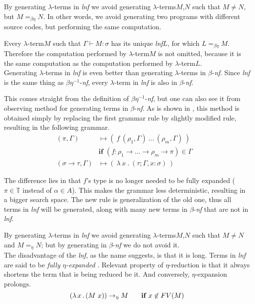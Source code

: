 \documentclass{sig-alternate}
\newcommand{\lterm}{$\lambda$-term\xspace}
\newcommand{\lterms}{$\lambda$-terms\xspace}
\newcommand{\turst}[3]{$#1\vdash{}#2:#3$\xspace}
\newcommand{\GMS}{\turst{\Gamma}{M}{\sigma}}
\newcommand{\lamb}[2]{( \lambda \, #1 \, . \, #2 )}
\newcommand{\bnf}{$\beta$-\textit{nf}\xspace}
\newcommand{\beenf}{$\beta\eta^{-1}$-\textit{nf}\xspace}
\newcommand{\lnf}{\textit{lnf}\xspace}
\newcommand{\ar}{\rightarrow\xspace}
\newcommand{\T}{\mathbb{T}\xspace}
\newcommand{\gar}{\longmapsto}
\begin{document}
By generating \lterms in \textit{lnf} we avoid generating 
\lterms $M$,$N$ such that $M \not= N$, but $M =_{\beta\eta} N$.
In other words, we avoid generating two programs with different 
source codes, but performing the same computation.

Every \lterm $M$ such that \GMS has its unique \lnf $L$, 
for which $L =_{\beta\eta} M$.
Therefore the computation performed by \lterm $M$ 
is not omitted, because it is the same computation
as the computation performed by \lterm $L$. \\

Generating \lterms in \lnf is even better than generating 
\lterms in \bnf. Since \lnf is the same thing as \beenf,
every \lterm in \lnf is also in \bnf. 

This comes straight from the definition of \beenf, 
but one can also see it from observing method for generating
terms in \bnf. As is shown in \cite{barendregt10}, 
this method is obtained simply by replacing  
the first grammar rule by slightly modified rule,
resulting in the following grammar.
\begin{align*}
( \pi , \Gamma )  
&\gar
(~f~( \rho_1 , \Gamma )~\dots~( \rho_m , \Gamma )~)
\\& \textbf{if } (f : \rho_1 \ar \dots \ar \rho_m \ar \pi) \in \Gamma
\\ 
( \sigma \rightarrow \tau , \Gamma )  
&\gar
(~\lambda~x~.~( \tau ; \Gamma,x:\sigma )~)
&   
\end{align*}

The difference lies in that $f$'s type is no longer needed to be fully expanded
($\pi \in \T$ instead of $\alpha \in A$). This makes the grammar less deterministic,
resulting in a bigger search space. The new rule is generalization of the old one,
thus all terms in \lnf will be generated, along with many new terms in \bnf that 
are not in \lnf. 
    
By generating \lterms in \lnf we avoid generating 
\lterms $M$,$N$ such that $M \not= N$ and $M =_{\eta} N$; 
but by generating in \bnf we do not avoid it.\\


The disadvantage of the \lnf, as the name suggests, is that it is long.
Terms in \lnf are said to be \textit{fully $\eta$-expanded} \cite{barendregt10}. 
Relevant property of $\eta$-reduction is that it always shortens the term
that is being reduced be it. And conversely, $\eta$-expansion prolongs.
$$\lamb{x}{(M~x)} \eArrow M \textbf{ ~~~~if } x \not\in FV(M) $$
\end{document}
